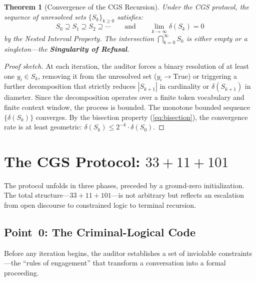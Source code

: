 \documentclass[11pt,a4paper]{article}
\theoremstyle{definition}
\theoremstyle{plain}
\newtheorem{theorem}{Theorem}[section]
\theoremstyle{remark}
\begin{document}
\begin{theorem}[Convergence of the CGS Recursion]\label{thm:convergence}
Under the CGS protocol, the sequence of unresolved sets $\{S_k\}_{k \geq 0}$ satisfies:
\begin{equation}
  S_0 \supseteq S_1 \supseteq S_2 \supseteq \cdots
  \qquad\text{and}\qquad
  \lim_{k \to \infty} \delta(S_k) = 0
\end{equation}
by the Nested Interval Property. The intersection $\displaystyle\bigcap_{k=0}^{\infty} S_k$ is either empty or a singleton---the \textbf{Singularity of Refusal}.
\end{theorem}

\begin{proof}[Proof sketch]
At each iteration, the auditor forces a binary resolution of at least one $y_i \in S_k$, removing it from the unresolved set ($y_i \to \mathrm{True}$) or triggering a further decomposition that strictly reduces $|S_{k+1}|$ in cardinality or $\delta(S_{k+1})$ in diameter. Since the decomposition operates over a finite token vocabulary and finite context window, the process is bounded. The monotone bounded sequence $\{\delta(S_k)\}$ converges. By the bisection property (\cref{eq:bisection}), the convergence rate is at least geometric: $\delta(S_k) \leq 2^{-k} \cdot \delta(S_0)$.
\end{proof}


\section{The CGS Protocol: $33 + 11 + 101$}\label{sec:protocol}

The protocol unfolds in three phases, preceded by a ground-zero initialization. The total structure---$33 + 11 + 101$---is not arbitrary but reflects an escalation from open discourse to constrained logic to terminal recursion.

\subsection{Point~0: The Criminal-Logical Code}
\label{subsec:point0}

Before any iteration begins, the auditor establishes a set of inviolable constraints---the ``rules of engagement'' that transform a conversation into a formal proceeding.
\end{document}
